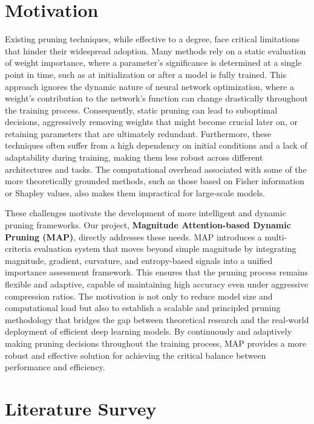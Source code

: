 \documentclass[12pt,a4paper]{report}
\begin{document}
\chapter{Motivation}
Existing pruning techniques, while effective to a degree, face critical limitations that hinder their widespread adoption. Many methods rely on a static evaluation of weight importance, where a parameter's significance is determined at a single point in time, such as at initialization or after a model is fully trained. This approach ignores the dynamic nature of neural network optimization, where a weight's contribution to the network's function can change drastically throughout the training process. Consequently, static pruning can lead to suboptimal decisions, aggressively removing weights that might become crucial later on, or retaining parameters that are ultimately redundant. Furthermore, these techniques often suffer from a high dependency on initial conditions and a lack of adaptability during training, making them less robust across different architectures and tasks. The computational overhead associated with some of the more theoretically grounded methods, such as those based on Fisher information or Shapley values, also makes them impractical for large-scale models.

These challenges motivate the development of more intelligent and dynamic pruning frameworks. Our project, \textbf{Magnitude Attention-based Dynamic Pruning (MAP)}, directly addresses these needs. MAP introduces a multi-criteria evaluation system that moves beyond simple magnitude by integrating magnitude, gradient, curvature, and entropy-based signals into a unified importance assessment framework. This ensures that the pruning process remains flexible and adaptive, capable of maintaining high accuracy even under aggressive compression ratios. The motivation is not only to reduce model size and computational load but also to establish a scalable and principled pruning methodology that bridges the gap between theoretical research and the real-world deployment of efficient deep learning models. By continuously and adaptively making pruning decisions throughout the training process, MAP provides a more robust and effective solution for achieving the critical balance between performance and efficiency.

\clearpage

\chapter{Literature Survey}
\end{document}
